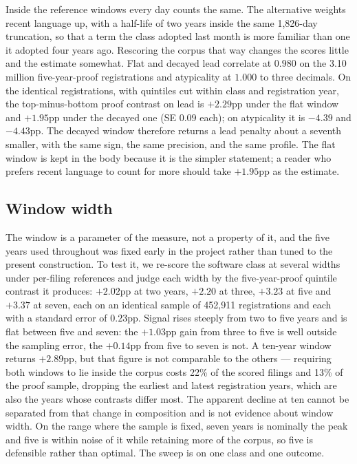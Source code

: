 Inside the reference windows every day counts the same. The alternative
weights recent language up, with a half-life of two years inside the same
1,826-day truncation, so that a term the class adopted last month is more
familiar than one it adopted four years ago. Rescoring the corpus that way
changes the scores little and the estimate somewhat. Flat and decayed lead
correlate at $0.980$ on the 3.10 million five-year-proof registrations and atypicality
at $1.000$ to three decimals. On the identical registrations, with quintiles
cut within class and registration year, the top-minus-bottom proof contrast
on lead is $+2.29$pp under the flat window and $+1.95$pp under the decayed
one (SE $0.09$ each); on atypicality it is $-4.39$ and $-4.43$pp. The
decayed window therefore returns a lead penalty about a seventh smaller,
with the same sign, the same precision, and the same profile. The flat
window is kept in the body because it is the simpler statement; a reader who
prefers recent language to count for more should take $+1.95$pp as the
estimate.

\subsection{Window width}\label{app:wsweep}

The window is a parameter of the measure, not a property of it, and the
five years used throughout was fixed early in the project rather than
tuned to the present construction. To test it, we re-score the software
class at several widths under per-filing references and judge each width
by the five-year-proof quintile contrast it produces: $+2.02$pp at two
years, $+2.20$ at three, $+3.23$ at five and $+3.37$ at seven, each on an
identical sample of 452{,}911 registrations and each with a standard
error of $0.23$pp. Signal
rises steeply from two to five years and is flat between five and seven: the
$+1.03$pp gain from three to five is well outside the sampling error, the
$+0.14$pp from five to seven is not. A ten-year window returns $+2.89$pp,
but that figure is not comparable to the others --- requiring both windows
to lie inside the corpus costs 22\% of the scored filings and 13\% of the
proof sample, dropping the earliest and latest registration years, which are
also the years whose contrasts differ most. The apparent decline at ten
cannot be separated from that change in composition and is not evidence
about window width. On the range where the sample is fixed, seven years is
nominally the peak and five is within noise of it while retaining more of
the corpus, so five is defensible rather than optimal. The sweep is on one class
and one outcome.

